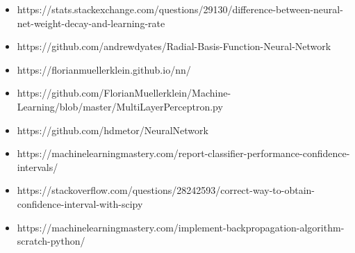 \documentclass[11pt]{article}
\providecommand{\tightlist}{%
      \setlength{\itemsep}{0pt}\setlength{\parskip}{0pt}}
\begin{document}
\begin{itemize}
\tightlist
\item
  https://stats.stackexchange.com/questions/29130/difference-between-neural-net-weight-decay-and-learning-rate
\item
  https://github.com/andrewdyates/Radial-Basis-Function-Neural-Network
\item
  https://florianmuellerklein.github.io/nn/
\item
  https://github.com/FlorianMuellerklein/Machine-Learning/blob/master/MultiLayerPerceptron.py
\item
  https://github.com/hdmetor/NeuralNetwork
\item
  https://machinelearningmastery.com/report-classifier-performance-confidence-intervals/
\item
  https://stackoverflow.com/questions/28242593/correct-way-to-obtain-confidence-interval-with-scipy
\item
  https://machinelearningmastery.com/implement-backpropagation-algorithm-scratch-python/
\end{itemize}


    
    
    
    
\end{document}

